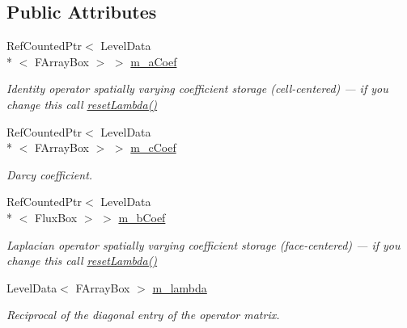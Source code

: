 \subsection*{Public Attributes}
\begin{DoxyCompactItemize}
\item 
\hypertarget{class_darcy_brinkman_op_a7e1b9891159ab88e702382380c253758}{Ref\-Counted\-Ptr$<$ Level\-Data\\*
$<$ F\-Array\-Box $>$ $>$ \hyperlink{class_darcy_brinkman_op_a7e1b9891159ab88e702382380c253758}{m\-\_\-a\-Coef}}\label{class_darcy_brinkman_op_a7e1b9891159ab88e702382380c253758}

\begin{DoxyCompactList}\small\item\em Identity operator spatially varying coefficient storage (cell-\/centered) --- if you change this call \hyperlink{class_darcy_brinkman_op_a35fa524145af3a0641f10817ce291b0b}{reset\-Lambda()} \end{DoxyCompactList}\item 
\hypertarget{class_darcy_brinkman_op_a6fd695093ab30f1ce1de57c4eb3f0d1e}{Ref\-Counted\-Ptr$<$ Level\-Data\\*
$<$ F\-Array\-Box $>$ $>$ \hyperlink{class_darcy_brinkman_op_a6fd695093ab30f1ce1de57c4eb3f0d1e}{m\-\_\-c\-Coef}}\label{class_darcy_brinkman_op_a6fd695093ab30f1ce1de57c4eb3f0d1e}

\begin{DoxyCompactList}\small\item\em Darcy coefficient. \end{DoxyCompactList}\item 
\hypertarget{class_darcy_brinkman_op_a2363c28bf18a93ddd9096973959fb299}{Ref\-Counted\-Ptr$<$ Level\-Data\\*
$<$ Flux\-Box $>$ $>$ \hyperlink{class_darcy_brinkman_op_a2363c28bf18a93ddd9096973959fb299}{m\-\_\-b\-Coef}}\label{class_darcy_brinkman_op_a2363c28bf18a93ddd9096973959fb299}

\begin{DoxyCompactList}\small\item\em Laplacian operator spatially varying coefficient storage (face-\/centered) --- if you change this call \hyperlink{class_darcy_brinkman_op_a35fa524145af3a0641f10817ce291b0b}{reset\-Lambda()} \end{DoxyCompactList}\item 
\hypertarget{class_darcy_brinkman_op_ab4521803f9a322aa5a1113f642e3a054}{Level\-Data$<$ F\-Array\-Box $>$ \hyperlink{class_darcy_brinkman_op_ab4521803f9a322aa5a1113f642e3a054}{m\-\_\-lambda}}\label{class_darcy_brinkman_op_ab4521803f9a322aa5a1113f642e3a054}

\begin{DoxyCompactList}\small\item\em Reciprocal of the diagonal entry of the operator matrix. \end{DoxyCompactList}\end{DoxyCompactItemize}
